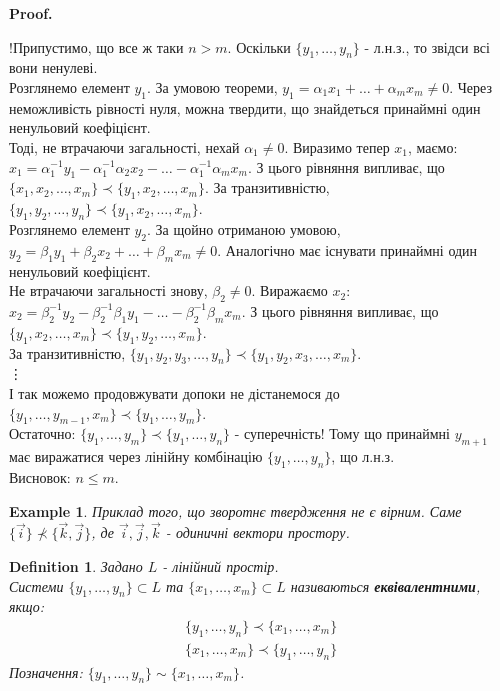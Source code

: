 \documentclass[a4paper, 10pt]{article}
\makeatletter
\def\qed{$\blacksquare$}
\theoremstyle{theoremdd}
\theoremstyle{theoremdd}
\newtheorem{definition}[theorem]{Definition}
\theoremstyle{theoremdd}
\theoremstyle{theoremdd}
\newtheorem{example}[theorem]{Example}
\theoremstyle{theoremdd}
\theoremstyle{theoremdd}
\theoremstyle{theoremdd}
\theoremstyle{theoremdd}
\renewenvironment{proof}[1][Proof.\\]{\par
\pushQED{\hfill \qed}%
\normalfont \topsep6\p@\@plus6\p@\relax
\trivlist
\item\relax
{\bfseries
#1\@addpunct{.}}\hspace\labelsep\ignorespaces
}{%
\popQED\endtrivlist\@endpefalse
}
\makeatother
\begin{document}
	\begin{proof}
	!Припустимо, що все ж таки $n > m$. Оскільки $\{y_1,\dots,y_n\}$ - л.н.з., то звідси всі вони ненулеві.\\
Розглянемо елемент $y_1$. За умовою теореми, $y_1 = \alpha_1 x_1 + \dots + \alpha_m x_m \neq 0$. Через неможливість рівності нуля, можна твердити, що знайдеться принаймні один ненульовий коефіцієнт.\\
Тоді, не втрачаючи загальності, нехай $\alpha_1 \neq 0$. Виразимо тепер $x_1$, маємо:\\
$x_1 = \alpha_1^{-1}y_1 - \alpha_1^{-1}\alpha_2 x_2 - \dots - \alpha_1^{-1} \alpha_m x_m$. З цього рівняння випливає, що $\{x_1, x_2, \dots,x_m\} \prec \{y_1, x_2, \dots,x_m\}$. За транзитивністю, $\{y_1,y_2,\dots,y_n \} \prec \{y_1,x_2,\dots,x_m \}$.\\
Розглянемо елемент $y_2$. За щойно отриманою умовою, $y_2 = \beta_1 y_1 + \beta_2 x_2 + \dots + \beta_m x_m \neq 0$. Аналогічно має існувати принаймні один ненульовий коефіцієнт. \\
Не втрачаючи загальності знову, $\beta_2 \neq 0$. Виражаємо $x_2$:\\
$x_2 = \beta_2^{-1}y_2 - \beta_2^{-1}\beta_1 y_1 - \dots - \beta_2^{-1} \beta_m x_m$. З цього рівняння випливає, що $\{y_1,x_2,\dots,x_m\} \prec \{y_1,y_2,\dots,x_m\}$.\\
За транзитивністю, $\{y_1,y_2,y_3,\dots,y_n\} \prec \{y_1,y_2,x_3,\dots,x_m\}$.\\
\vdots \\
І так можемо продовжувати допоки не дістанемося до $\{y_1,\dots, y_{m-1}, x_m\} \prec \{y_1,\dots,y_m\}$.\\
Остаточно: $\{y_1,\dots,y_m\} \prec \{y_1,\dots,y_n\}$ - суперечність! Тому що принаймні $y_{m+1}$ має виражатися через лінійну комбінацію $\{y_1,\dots,y_n\}$, що л.н.з.\\
Висновок: $n \leq m$.	
	\end{proof}
	
	\begin{example}
	Приклад того, що зворотнє твердження не є вірним. Саме
	$\{\vec{i}\} \not\prec \{\vec{k}, \vec{j}\}$, де $\vec{i},\vec{j},\vec{k}$ - одиничні вектори простору.
	\end{example}
	
	\begin{definition}
	Задано $L$ - лінійний простір.\\
	Системи $\{y_1, \dots, y_n \} \subset L$ та $\{x_1, \dots, x_m \} \subset L$ називаються \textbf{еквівалентними}, якщо:
	\begin{align*}
	\{y_1, \dots, y_n \} \prec \{x_1, \dots, x_m \} \\
	\{x_1, \dots, x_m \} \prec \{y_1, \dots, y_n \}
	\end{align*}
	Позначення: $\{y_1, \dots, y_n \} \sim \{x_1, \dots, x_m \}$.
	\end{definition}
	
\end{document}
